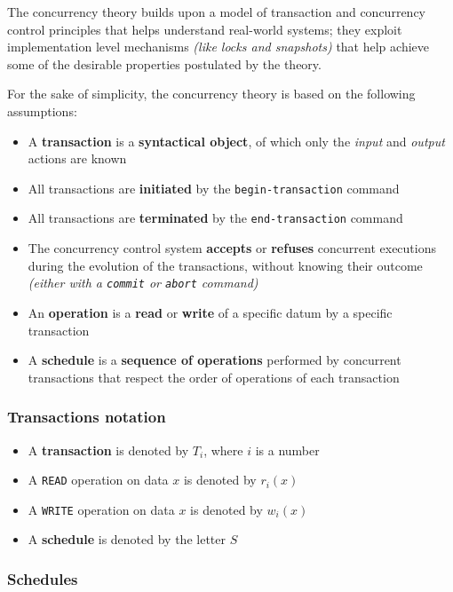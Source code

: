 \documentclass[english]{article}
\begin{document}
The concurrency theory builds upon a model of transaction and concurrency control principles that helps understand real-world systems;
they exploit implementation level mechanisms \textit{(like locks and snapshots)} that help achieve some of the desirable properties postulated by the theory.

For the sake of simplicity, the concurrency theory is based on the following assumptions:

\begin{itemize}
  \item A \textbf{transaction} is a \textbf{syntactical object}, of which only the \textit{input} and \textit{output} actions are known
  \item All transactions are \textbf{initiated} by the \texttt{begin-transaction} command
  \item All transactions are \textbf{terminated} by the \texttt{end-transaction} command
  \item The concurrency control system \textbf{accepts} or \textbf{refuses} concurrent executions during the evolution of the transactions, without knowing their outcome \textit{(either with a \texttt{commit} or \texttt{abort} command)}
  \item An \textbf{operation} is a \textbf{read} or \textbf{write} of a specific datum by a specific transaction
  \item A \textbf{schedule} is a \textbf{sequence of operations} performed by concurrent transactions that respect the order of operations of each transaction
\end{itemize}

\subsubsection{Transactions notation}

\begin{itemize}
  \item A \textbf{transaction} is denoted by \(T_i\), where \(i\) is a number
  \item A \texttt{READ} operation on data \(x\) is denoted by \(r_i(x)\)
  \item A \texttt{WRITE} operation on data \(x\) is denoted by \(w_i(x)\)
  \item A \textbf{schedule} is denoted by the letter \(S\)
\end{itemize}

\subsubsection{Schedules}
\end{document}
